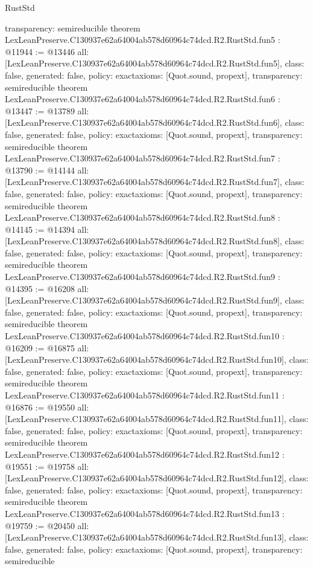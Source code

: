 \begin{lexlean}{RustStd}
\begin{coremodule}
{  transparency: semireducible
}
theorem LexLeanPreserve.C130937e62a64004ab578d60964c74dcd.R2.RustStd.fun5 : @11944 := @13446 {
  all: [LexLeanPreserve.C130937e62a64004ab578d60964c74dcd.R2.RustStd.fun5],
  class: false,
  generated: false,
  policy: exact{axioms: [Quot.sound, propext]},
  transparency: semireducible
}
theorem LexLeanPreserve.C130937e62a64004ab578d60964c74dcd.R2.RustStd.fun6 : @13447 := @13789 {
  all: [LexLeanPreserve.C130937e62a64004ab578d60964c74dcd.R2.RustStd.fun6],
  class: false,
  generated: false,
  policy: exact{axioms: [Quot.sound, propext]},
  transparency: semireducible
}
theorem LexLeanPreserve.C130937e62a64004ab578d60964c74dcd.R2.RustStd.fun7 : @13790 := @14144 {
  all: [LexLeanPreserve.C130937e62a64004ab578d60964c74dcd.R2.RustStd.fun7],
  class: false,
  generated: false,
  policy: exact{axioms: [Quot.sound, propext]},
  transparency: semireducible
}
theorem LexLeanPreserve.C130937e62a64004ab578d60964c74dcd.R2.RustStd.fun8 : @14145 := @14394 {
  all: [LexLeanPreserve.C130937e62a64004ab578d60964c74dcd.R2.RustStd.fun8],
  class: false,
  generated: false,
  policy: exact{axioms: [Quot.sound, propext]},
  transparency: semireducible
}
theorem LexLeanPreserve.C130937e62a64004ab578d60964c74dcd.R2.RustStd.fun9 : @14395 := @16208 {
  all: [LexLeanPreserve.C130937e62a64004ab578d60964c74dcd.R2.RustStd.fun9],
  class: false,
  generated: false,
  policy: exact{axioms: [Quot.sound, propext]},
  transparency: semireducible
}
theorem LexLeanPreserve.C130937e62a64004ab578d60964c74dcd.R2.RustStd.fun10 : @16209 := @16875 {
  all: [LexLeanPreserve.C130937e62a64004ab578d60964c74dcd.R2.RustStd.fun10],
  class: false,
  generated: false,
  policy: exact{axioms: [Quot.sound, propext]},
  transparency: semireducible
}
theorem LexLeanPreserve.C130937e62a64004ab578d60964c74dcd.R2.RustStd.fun11 : @16876 := @19550 {
  all: [LexLeanPreserve.C130937e62a64004ab578d60964c74dcd.R2.RustStd.fun11],
  class: false,
  generated: false,
  policy: exact{axioms: [Quot.sound, propext]},
  transparency: semireducible
}
theorem LexLeanPreserve.C130937e62a64004ab578d60964c74dcd.R2.RustStd.fun12 : @19551 := @19758 {
  all: [LexLeanPreserve.C130937e62a64004ab578d60964c74dcd.R2.RustStd.fun12],
  class: false,
  generated: false,
  policy: exact{axioms: [Quot.sound, propext]},
  transparency: semireducible
}
theorem LexLeanPreserve.C130937e62a64004ab578d60964c74dcd.R2.RustStd.fun13 : @19759 := @20450 {
  all: [LexLeanPreserve.C130937e62a64004ab578d60964c74dcd.R2.RustStd.fun13],
  class: false,
  generated: false,
  policy: exact{axioms: [Quot.sound, propext]},
  transparency: semireducible
}
\end{coremodule}
\end{lexlean}

